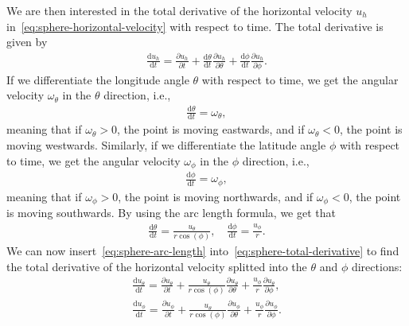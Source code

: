 We are then interested in the total derivative of the horizontal velocity $u_h$ in~\eqref{eq:sphere-horizontal-velocity} with respect to time.
The total derivative is given by
\begin{align}\label{eq:sphere-total-derivative}
    \frac{\text{d}u_h}{\text{d}t} = \frac{\partial u_h}{\partial t} + \frac{\text{d}\theta}{\text{d}t} \frac{\partial u_h}{\partial \theta} + \frac{\text{d}\phi}{\text{d}t} \frac{\partial u_h}{\partial \phi}.
\end{align}
If we differentiate the longitude angle $\theta$ with respect to time, we get the angular velocity $\omega_\theta$ in the $\theta$ direction, i.e.,
\begin{align*}
    \frac{\text{d}\theta}{\text{d}t} = \omega_\theta,
\end{align*}
meaning that if $\omega_\theta > 0$, the point is moving eastwards, and if $\omega_\theta < 0$, the point is moving westwards.
Similarly, if we differentiate the latitude angle $\phi$ with respect to time, we get the angular velocity $\omega_\phi$ in the $\phi$ direction, i.e.,
\begin{align*}
    \frac{\text{d}\phi}{\text{d}t} = \omega_\phi,
\end{align*}
meaning that if $\omega_\phi > 0$, the point is moving northwards, and if $\omega_\phi < 0$, the point is moving southwards.
By using the arc length formula, we get that 
\begin{align}\label{eq:sphere-arc-length}
    \frac{\text{d}\theta}{\text{d}t} =  \frac{u_\theta}{r \cos(\phi)},
    \quad \frac{\text{d}\phi}{\text{d}t} = \frac{u_\phi}{r}.
\end{align}
We can now insert~\eqref{eq:sphere-arc-length} into~\eqref{eq:sphere-total-derivative} to find the total derivative of the horizontal velocity splitted into the $\theta$ and $\phi$ directions:
\begin{equation}\label{eq:sphere-total-derivative-split}
    \begin{aligned}
        \frac{\text{d}u_\theta}{\text{d}t} = \frac{\partial u_\theta}{\partial t} + \frac{u_\theta}{r \cos(\phi)} \frac{\partial u_\theta}{\partial \theta} + \frac{u_\phi}{r} \frac{\partial u_\theta}{\partial \phi}, \\
        \frac{\text{d}u_\phi}{\text{d}t} = \frac{\partial u_\phi}{\partial t} + \frac{u_\theta}{r \cos(\phi)} \frac{\partial u_\phi}{\partial \theta} + \frac{u_\phi}{r} \frac{\partial u_\phi}{\partial \phi}.
    \end{aligned}
\end{equation}

